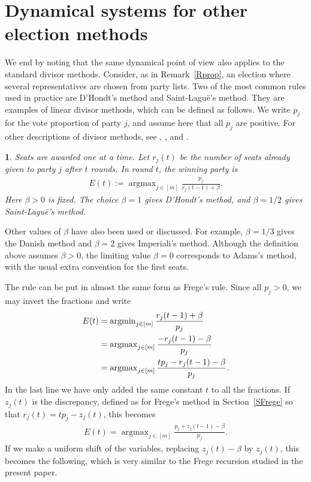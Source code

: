 \documentclass[11pt,reqno,tbtags,a4paper]{amsart}
\numberwithin{equation}{section}
\theoremstyle{plain}%
\newtheorem*{method}{\MethodName}
\theoremstyle{definition}
\theoremstyle{remark}
\newcommand{\refR}[1]{Remark~\ref{#1}}
\newcommand{\refS}[1]{Section~\ref{#1}}
\newcommand\argmax{\operatorname{argmax}}
\newcommand\argmin {\operatorname{argmin}}
\newcommand\gb{\beta}
\newcommand\dH{D'Hondt}
\newcommand\SL{Saint-Lagu\"e}
\newcommand\0{{\boldsymbol 0}}
\newcommand\1{{\boldsymbol 1}}
\begin{document}
\section{Dynamical systems for other election  methods}
\label{Sdiv}

We end by noting that the same dynamical point of view also applies to the
standard divisor methods.
Consider, as in \refR{Rprop}, an election where several representatives are
chosen from party lists.  Two of the most common rules used in practice
are \dH's method and \SL's method.  
They are examples of linear divisor methods, which can be defined as
follows.  We write $p_j$ for
the vote proportion of party $j$, and assume here that all $p_j$ are positive.
For other descriptions of divisor methods, see \cite{BY}, \cite{Pukelsheim},
and \cite[Appendix A]{SJ262}.

\def\MethodName{Linear divisor methods}
\begin{method}
Seats are awarded one at a time.  Let $r_j(t)$ be the number of seats already
given to party $j$ after $t$ rounds.  In round $t$, the winning party is
\begin{align}
        E(t):=\argmax_{j\in[m]} \frac{p_j}{r_j(t-1)+\beta}.
\end{align}
Here $\beta>0$ is fixed.  The choice $\beta=1$ gives \dH{}'s method, and
$\beta=1/2$ gives \SL{}'s method.
\end{method}

Other values of $\beta$ have also been used or discussed.  For example,
$\beta=1/3$ gives the Danish method and $\beta=2$ gives Imperiali's method.
Although the definition above assumes $\beta>0$, the limiting value
$\beta=0$ corresponds to Adams's method, with the usual extra convention for
the first seats.

The rule can be put in almost the same form as Frege's rule.  Since all
$p_j>0$, we may invert the fractions and write
\begin{align}
E(t)
&=\argmin_{j\in[m]} \frac{r_j(t-1)+\beta}{p_j}
\notag\\&
=\argmax_{j\in[m]} \frac{-r_j(t-1)-\beta}{p_j}
\notag\\&
=\argmax_{j\in[m]} \frac{t p_j-r_j(t-1)-\beta}{p_j}.
\end{align}
In the last line we have only added the same constant $t$ to all the
fractions.  If $z_j(t)$ is the discrepancy, defined as for Frege's method 
in \refS{SFrege} so that
$r_j(t)=t p_j-z_j(t)$, this becomes
\begin{align}
        E(t)=\argmax_{j\in[m]} \frac{p_j+z_j(t-1)-\beta}{p_j}.
\end{align}
If we make a uniform shift of the variables,
replacing $z_j(t)-\gb$ by $z_j(t)$, this becomes 
the following, which is very similar to the
Frege recursion studied in the present paper.
\end{document}
